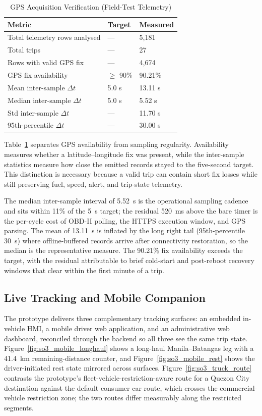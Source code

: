 \begin{table}[!htbp]
\centering
\caption{GPS Acquisition Verification (Field-Test Telemetry)}
\label{tab:so3_gps}
\scriptsize
\begin{tabular}{|p{}|p{}|p{}|}
\hline
\textbf{Metric} & \textbf{Target} & \textbf{Measured} \\
\hline
Total telemetry rows analysed & --- & 5{,}181 \\
\hline
Total trips & --- & 27 \\
\hline
Rows with valid GPS fix & --- & 4{,}674 \\
\hline
GPS fix availability & $\geq$ 90\% & 90.21\% \\
\hline
Mean inter-sample $\Delta t$ & 5.0 s & 13.11 s \\
\hline
Median inter-sample $\Delta t$ & 5.0 s & 5.52 s \\
\hline
Std inter-sample $\Delta t$ & --- & 11.70 s \\
\hline
95th-percentile $\Delta t$ & --- & 30.00 s \\
\hline
\end{tabular}
\normalsize
\end{table}

Table~\ref{tab:so3_gps} separates GPS availability from sampling regularity. Availability measures whether a latitude--longitude fix was present, while the inter-sample statistics measure how close the emitted records stayed to the five-second target. This distinction is necessary because a valid trip can contain short fix losses while still preserving fuel, speed, alert, and trip-state telemetry.

The median inter-sample interval of 5.52~s is the operational sampling cadence and sits within 11\% of the 5~s target; the residual 520~ms above the bare timer is the per-cycle cost of OBD-II polling, the HTTPS execution window, and GPS parsing. The mean of 13.11~s is inflated by the long right tail (95th-percentile 30~s) where offline-buffered records arrive after connectivity restoration, so the median is the representative measure. The 90.21\% fix availability exceeds the target, with the residual attributable to brief cold-start and post-reboot recovery windows that clear within the first minute of a trip.

\subsection{Live Tracking and Mobile Companion}
The prototype delivers three complementary tracking surfaces: an embedded in-vehicle HMI, a mobile driver web application, and an administrative web dashboard, reconciled through the backend so all three see the same trip state. Figure~\ref{fig:so3_mobile_longhaul} shows a long-haul Manila--Batangas leg with a 41.4~km remaining-distance counter, and Figure~\ref{fig:so3_mobile_rest} shows the driver-initiated rest state mirrored across surfaces. Figure~\ref{fig:so3_truck_route} contrasts the prototype's fleet-vehicle-restriction-aware route for a Quezon City destination against the default consumer car route, which crosses the commercial-vehicle restriction zone; the two routes differ measurably along the restricted segments.

